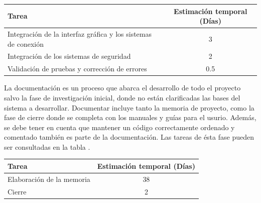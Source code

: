 \documentclass[12pt]{article}
\begin{document}
            \begin{tabular}{|l|c|}
                \hline
                \textbf{Tarea}                                                              &   \textbf{Estimación temporal} (Días) \\           
                \hline
                Integración de la interfaz gráfica y los sistemas de conexión               &   3                                   \\
                Integración de los sistemas de seguridad                                    &   2                                   \\
                Validación de pruebas y corrección de errores                               &   0.5                                 \\
                \hline
            \end{tabular}

            La documentación es un proceso que abarca el desarrollo de todo el proyecto salvo la fase de investigación inicial, donde no están clarificadas las bases del sistema a desarrollar. Documentar incluye tanto la memoria de proyecto, como la fase de cierre donde se completa con los manuales y guías para el usurio. Además, se debe tener en cuenta que mantener un código correctamente ordenado y comentado también es parte de la documentación. Las tareas de ésta fase pueden ser consultadas en la tabla .

            \begin{tabular}{|l|c|}
                \hline
                \textbf{Tarea}                                                              &   \textbf{Estimación temporal} (Días) \\         
                \hline
                Elaboración de la memoria                                                   &   38                                  \\
                Cierre                                                                      &   2                                   \\
                \hline
            \end{tabular}
\end{document}
